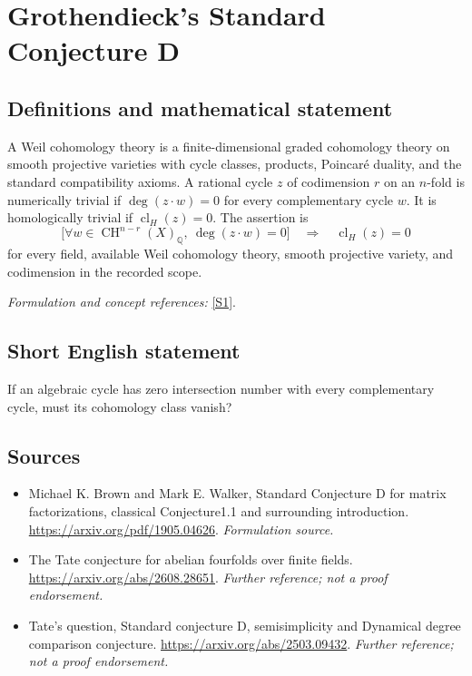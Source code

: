 \documentclass[11pt]{article}
\begin{document}
\section*{\texorpdfstring{Grothendieck's Standard Conjecture D}{Grothendieck's Standard Conjecture D}}\label{44}
\subsection{Definitions and mathematical statement}
A Weil cohomology theory is a finite-dimensional graded cohomology theory on smooth projective varieties with cycle classes, products, Poincaré duality, and the standard compatibility axioms. A rational cycle $z$ of codimension $r$ on an $n$-fold is numerically trivial if $\deg(z\cdot w)=0$ for every complementary cycle $w$. It is homologically trivial if $\operatorname{cl}_H(z)=0$. The assertion is
\[
 \bigl[\forall w\in\operatorname{CH}^{n-r}(X)_{{\mathbb{Q}}},\ \deg(z\cdot w)=0\bigr]
 \quad\Longrightarrow\quad \operatorname{cl}_H(z)=0
\]
for every field, available Weil cohomology theory, smooth projective variety, and codimension in the recorded scope.
\par\smallskip\textit{Formulation and concept references:} \href{https://arxiv.org/pdf/1905.04626}{[S1]}.

\subsection{Short English statement}
If an algebraic cycle has zero intersection number with every complementary cycle, must its cohomology class vanish?
\subsection{Sources}
\begin{itemize}
\item[S1]Michael K. Brown and Mark E. Walker, Standard Conjecture D for matrix factorizations, classical Conjecture1.1 and surrounding introduction.
\url{https://arxiv.org/pdf/1905.04626}.
\textit{Formulation source.}
\item[S2]The Tate conjecture for abelian fourfolds over finite fields.
\url{https://arxiv.org/abs/2608.28651}.
\textit{Further reference; not a proof endorsement.}
\item[S3]Tate's question, Standard conjecture D, semisimplicity and Dynamical degree comparison conjecture.
\url{https://arxiv.org/abs/2503.09432}.
\textit{Further reference; not a proof endorsement.}
\end{itemize}
\end{document}
